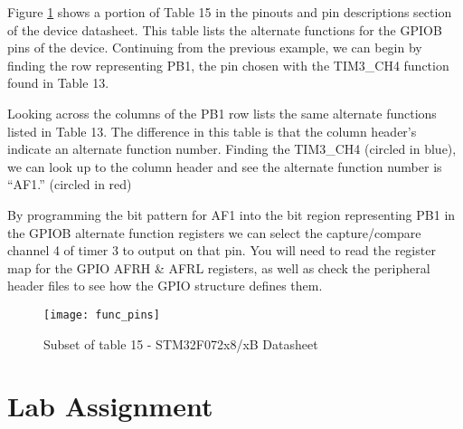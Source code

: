 \documentclass[openany,11pt,fleqn]{book} %
\begin{document}
   	
    \begin{example} 
        \label{example3}
Figure \ref{func_pins} shows a portion of Table 15 in the pinouts and pin descriptions section of the device datasheet. This table lists the alternate functions for the GPIOB pins of the device. Continuing from the previous example, we can begin by finding the row representing PB1, the pin chosen with the TIM3\_CH4 function found in Table 13. 

Looking across the columns of the PB1 row lists the same alternate functions listed in Table 13. The difference in this table is that the column header's indicate an alternate function number. Finding the TIM3\_CH4 (circled in blue), we can look up to the column header and see the alternate function number is ``AF1.'' (circled in red)

By programming the bit pattern for AF1 into the bit region representing PB1 in the GPIOB alternate function registers we can select the capture/compare channel 4 of timer 3 to output on that pin. You will need to read the register map for the GPIO AFRH \& AFRL registers, as well as check the peripheral header files to see how the GPIO structure defines them.  
    \end{example}

    \begin{figure}[]
    \centering\texttt{[image: func\_pins]}
    \caption{Subset of table 15 - STM32F072x8/xB Datasheet}
    \label{func_pins}
\end{figure}
    
\section{\color{blue}Lab Assignment}
    
\end{document}
